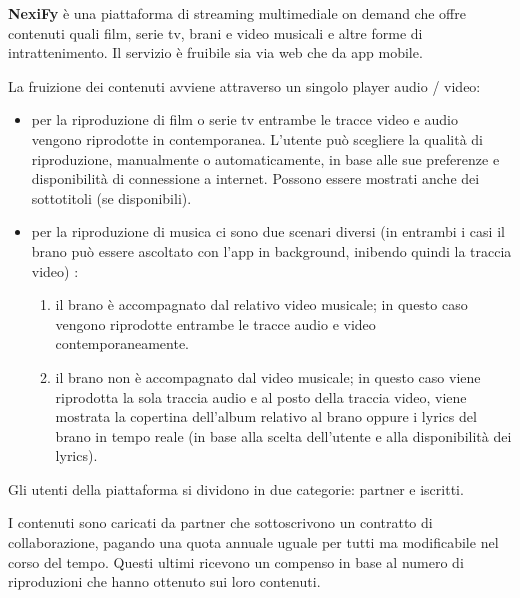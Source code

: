 \begin{flushleft}
    {\textbf{NexiFy} è una piattaforma di streaming multimediale on demand che offre contenuti quali film, serie tv, brani e video musicali e altre forme di intrattenimento. Il servizio è fruibile sia via web che da app mobile.}
\end{flushleft}

\begin{flushleft}
    {La fruizione dei contenuti avviene attraverso un singolo player audio / video:} 
    
    \begin{itemize}
        \item {per la riproduzione di film o serie tv entrambe le tracce video e audio vengono riprodotte in contemporanea. L’utente può scegliere la qualità di riproduzione, manualmente o automaticamente, in base alle sue preferenze e disponibilità di connessione a internet. Possono essere mostrati anche dei sottotitoli (se disponibili).}
        
        \item {per la riproduzione di musica ci sono due scenari diversi (in entrambi i casi il brano può essere ascoltato con l’app in background, inibendo quindi la traccia video) :}
        \begin{enumerate}
            \item {il brano è accompagnato dal relativo video musicale; in questo caso vengono riprodotte entrambe le tracce audio e video contemporaneamente.}
            \item {il brano non è accompagnato dal video musicale; in questo caso viene riprodotta la sola traccia audio e al posto della traccia video, viene mostrata la copertina dell’album relativo al brano oppure i lyrics del brano in tempo reale (in base alla scelta dell’utente e alla disponibilità dei lyrics).}
        \end{enumerate}
    \end{itemize}
\end{flushleft}
    
\begin{flushleft}
    {Gli utenti della piattaforma si dividono in due categorie: partner e iscritti.}
\end{flushleft}

\begin{flushleft}
    {I contenuti sono caricati da partner che sottoscrivono un contratto di collaborazione, pagando una quota annuale uguale per tutti ma modificabile nel corso del tempo. Questi ultimi ricevono un compenso in base al numero di riproduzioni che hanno ottenuto sui loro contenuti.}
\end{flushleft}

